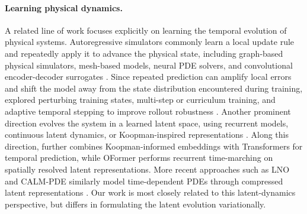 \documentclass[11pt]{article}
\begin{document}
\paragraph{Learning physical dynamics.} A related line of work focuses explicitly on learning the temporal evolution of physical systems. Autoregressive simulators commonly learn a local update rule and repeatedly apply it to advance the physical state, including graph-based physical simulators, mesh-based models, neural PDE solvers, and convolutional encoder-decoder surrogates \citep{sanchez2020learning,pfaff2020learning,brandstetter2022message,stachenfeld2021learned,geneva2020modeling}. Since repeated prediction can amplify local errors and shift the model away from the state distribution encountered during training, explored perturbing training states, multi-step or curriculum training, and adaptive temporal stepping to improve rollout robustness \citep{sanchez2020learning,li2022transformer,hagnberger2025calm, wu2026tante}. Another prominent direction evolves the system in a learned latent space, using recurrent models, continuous latent dynamics, or Koopman-inspired representations \citep{wiewel2019latent,lusch2018deep,morton2018deep,pan2020physics,yin2023continuous}. Along this direction, \cite{geneva2022transformers} further combines Koopman-informed embeddings with Transformers for temporal prediction, while OFormer \citep{li2022transformer} performs recurrent time-marching on spatially resolved latent representations. More recent approaches such as LNO and CALM-PDE similarly model time-dependent PDEs through compressed latent representations \citep{wang2024latent,hagnberger2025calm}. Our work is most closely related to this latent-dynamics perspective, but differs in formulating the latent evolution variationally.
\end{document}
